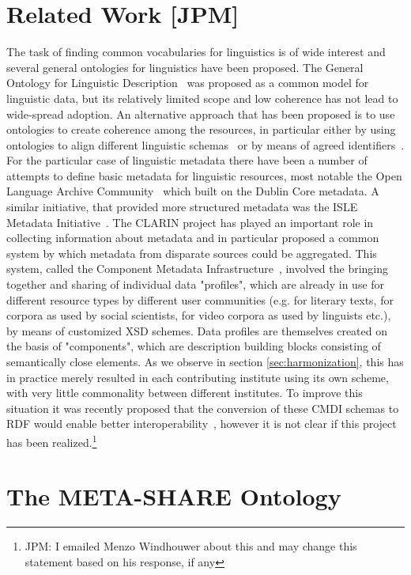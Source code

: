 \documentclass{llncs}
\begin{document}
\section{Related Work [JPM]}
\label{sec:relatedwork}
The task of finding common vocabularies for linguistics is of wide interest and
several general ontologies for linguistics have been proposed. The General
Ontology for Linguistic Description~\cite[GOLD]{farrar2002common} was proposed
as a common model for linguistic data, but its relatively limited scope and low
coherence has not lead to wide-spread adoption. An alternative approach that has
been proposed is to use ontologies to create coherence among the resources, in
particular either by using ontologies to align different linguistic
schemas~\cite{chiarcos2012ontologies} or by means of agreed
identifiers~\cite{kemps2008isocat}. For the particular case of linguistic
metadata there have been a number of attempts to define basic metadata for
linguistic resources, most notable the Open Language Archive
Community~\cite[OLAC]{bird2001olac} which built on the Dublin Core metadata. A
similar initiative, that provided more structured metadata was the ISLE Metadata
Initiative~\cite[IMDI]{broeder2001imdi}.
The CLARIN project has played an important role in collecting information about
metadata and in particular proposed a common system by which metadata from
disparate sources could be aggregated. This system, called the Component
Metadata Infrastructure~\cite{broeder2012cmdi}, involved the bringing together and sharing of
individual data "profiles", which are already in use for different resource types by different user communities (e.g. for literary texts, for corpora as used by social scientists, for video corpora as used by linguists etc.), by means of customized XSD schemes. Data profiles are themselves created on the basis of "components", which are description building blocks consisting of semantically close elements.
As we observe in section \ref{sec:harmonization}, this has in practice merely
resulted in each contributing institute using its own scheme, with very little
commonality between different institutes. To improve this situation it was
recently proposed that the conversion of these CMDI schemas to RDF would enable
better interoperability~\cite{durco2014clarin}, however it is not clear if this
project has been realized.\footnote{JPM: I emailed Menzo Windhouwer about this
and may change this statement based on his response, if any}
\section{The META-SHARE Ontology}
\label{sec:ontology}
\end{document}
